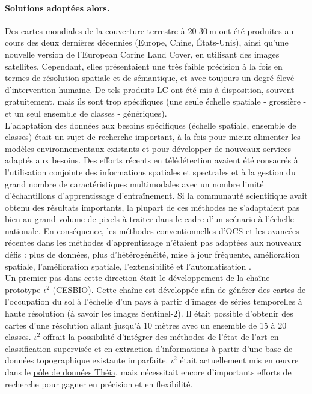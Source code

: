 \paragraph{Solutions adoptées alors.} Des cartes mondiales de la couverture terrestre à 20-30$\:$m ont été produites au cours des deux dernières décennies (Europe, Chine, États-Unis), ainsi qu'une nouvelle version de l'European Corine Land Cover, en utilisant des images satellites. Cependant, elles présentaient une très faible précision à la fois en termes de résolution spatiale et de sémantique, et avec toujours un degré élevé d'intervention humaine. De tels produits LC ont été mis à disposition, souvent gratuitement, mais ils sont trop spécifiques (une seule échelle spatiale - grossière -  et un seul ensemble de classes - génériques).\\
L'adaptation des données aux besoins spécifiques (échelle spatiale, ensemble de classes) était un sujet de recherche important, à la fois pour mieux alimenter les modèles environnementaux existants et pour développer de nouveaux services adaptés aux besoins. Des efforts récents en télédétection avaient été consacrés à l'utilisation conjointe des informations spatiales et spectrales et à la gestion du grand nombre de caractéristiques multimodales avec un nombre limité d'échantillons d'apprentissage
d'entraînement. Si la communauté scientifique avait obtenu des résultats  importants, la plupart de ces méthodes ne s'adaptaient pas bien au grand volume de pixels à traiter dans le cadre d'un scénario à l'échelle nationale. En conséquence, les méthodes conventionnelles d'OCS et les avancées récentes dans les méthodes d'apprentissage n'étaient pas adaptées aux nouveaux défis : plus de données, plus d'hétérogénéité, mise à jour fréquente, amélioration spatiale, l'amélioration spatiale, l'extensibilité et l'automatisation \cite{isprs-archives-XLIII-B2-2020-703-2020}.\\
Un premier pas dans cette direction était le développement de la chaîne prototype $\iota^2$ (CESBIO). Cette chaîne est développée
afin de générer des cartes de l'occupation du sol à l'échelle d'un pays à partir d'images de séries temporelles à haute résolution (à savoir les images Sentinel-2). Il était possible d'obtenir des cartes d'une résolution allant jusqu'à 10 mètres avec un ensemble de 15 à 20 classes. $\iota^2$ offrait la possibilité d'intégrer des méthodes de l'état de l'art en classification supervisée et en extraction d'informations à partir d'une base de données topographique existante imparfaite. $\iota^2$ était actuellement mis en œuvre dans le \href{https://www.theia-land.fr/pole-theia-2/}{pôle de données Théia}, mais nécessitait encore d'importants efforts de recherche pour gagner en précision et en flexibilité.

